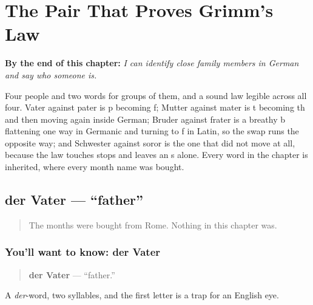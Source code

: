 
\chapter{The Pair That Proves Grimm's Law}
\label{ch:family}

\begin{chapteropening}
\textbf{By the end of this chapter:} \emph{I can identify close family members in German and say who someone is.}

Four people and two words for groups of them, and a sound law legible across all four. Vater against pater is p becoming f; Mutter against mater is t becoming th and then moving again inside German; Bruder against frater is a breathy b flattening one way in Germanic and turning to f in Latin, so the swap runs the opposite way; and Schwester against soror is the one that did not move at all, because the law touches stops and leaves an s alone. Every word in the chapter is inherited, where every month name was bought.
\end{chapteropening}

\section[der Vater]{der Vater — \textquotedblleft{}father\textquotedblright{}}

\label{lesson:GE-C10-vater}



\begin{quote}
The months were bought from Rome. Nothing in this chapter was.
\end{quote}

\subsection*{You'll want to know: der Vater}
\begin{quote}
\textbf{der Vater} — \textquotedblleft{}father.\textquotedblright{}
\end{quote}

A \emph{der}-word, two syllables, and the first letter is a trap for an English eye.

